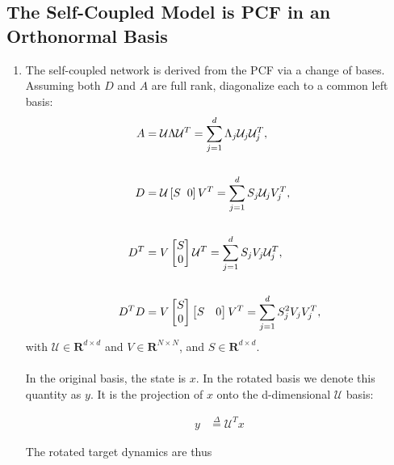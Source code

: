 \clearpage

\subsection{The Self-Coupled Model is PCF in an Orthonormal Basis}
\begin{enumerate}
\item The self-coupled network is derived from the PCF via a change of bases. Assuming both $D$ and $A$ are full rank, diagonalize each to a common left basis:
\begin{align*}
    A &= \mathcal{U} \Lambda \mathcal{U}^T = \sum_{j=1}^d \Lambda_j \mathcal{U}_j \mathcal{U}_j^T,\\
    \\
    D &= \mathcal{U} \left[S \hspace{2mm} 0 \right]  V^T = \sum_{j=1}^d S_j \mathcal{U}_j  V_j^T,\\
    \\
    D^T &= V \begin{bmatrix} S \\ 0\end{bmatrix} \mathcal{U}^T = \sum_{j=1}^d S_j V_j  \mathcal{U}_j^T, \\
    \\
    D^T D  &= V \begin{bmatrix} S \\ 0\end{bmatrix} \begin{bmatrix} S & 0\end{bmatrix} V^T
     = \sum_{j=1}^d S_j^2 V_j V_j^T , 
\end{align*}
with $\mathcal{U} \in \mathbf{R}^{d \times d}$ and $V \in \mathbf{R}^{N \times N}$, and $S \in \mathbf{R}^{d \times d }$. \\
\\

In the original basis, the state is $x$. In the rotated basis we denote this quantity as $y$. It is the projection of $x$ onto the d-dimensional $\mathcal{U}$ basis:

\begin{align}
\label{eq:definition_rotated_state_space}
y &\overset{\Delta}{=} \mathcal{U}^T x 
\end{align}

The rotated target dynamics are thus


\end{enumerate}

